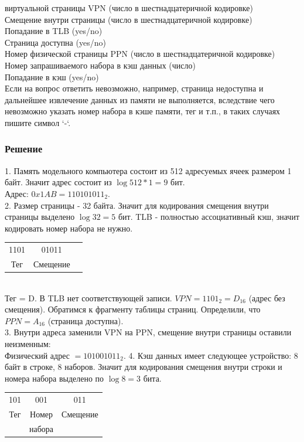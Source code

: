 \documentclass[12pt, letterpaper]{article}
\begin{document}
 виртуальной страницы VPN (число в шестнадцатеричной кодировке)\\
Смещение внутри страницы (число в шестнадцатеричной кодировке)\\
Попадание в TLB (yes/no)\\
Страница доступна (yes/no)\\
Номер физической страницы PPN (число в шестнадцатеричной кодировке)\\
Номер запрашиваемого набора в кэш данных (число)\\
Попадание в кэш (yes/no)\\

Если на вопрос ответить невозможно, например, страница недоступна и дальнейшее извлечение данных из памяти не выполняется, вследствие чего невозможно указать номер набора в кэше памяти, тег и т.п., в таких случаях пишите символ ‘-‘.
\newpage
\subsubsection{Решение}
1. Память модельного компьютера состоит из 512 адресуемых ячеек размером
1 байт. Значит адрес состоит из $\log 512*1=9$ бит.\\
Адрес: $0x1AB=110101011_2$.\\
2. Размер страницы - 32 байта. Значит для кодирования смещения внутри страницы выделено $\log 32=5$ бит. TLB - полностью ассоциативный кэш, значит кодировать номер набора не нужно.\\

\begin{tabular}{c c c}
    1101 & 01011  \\
    Тег& Смещение\\
\end{tabular}\\

Тег = D. В TLB нет соответствующей записи. $VPN=1101_2=D_{16}$ (адрес без смещения). Обратимся к фрагменту таблицы страниц. Определили, что $PPN=A_{16}$ (страница доступна).\\
3. Внутри адреса заменили VPN на PPN, смещение внутри страницы оставили неизменным:\\
Физический адрес $=101001011_2$. 
4. Кэш данных имеет следующее устройство: 8 байт в строке, 8 наборов. Значит для кодирования смещения внутри строки и номера набора выделено по $\log 8=3$ бита.\\

\begin{tabular}{c c c}
    101 & 001 & 011  \\
    Тег& Номер & Смещение\\
    & набора &\\
\end{tabular}\\
\end{document}
